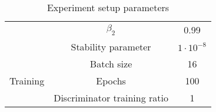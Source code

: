 \begin{table}[H]
{\begin{tabular}{|ccc|cc|}
    \multicolumn{1}{|c|}{}                                    & \multicolumn{2}{c|}{}                                                       & $\beta_2$                    & 0.99               \\
    \multicolumn{1}{|c|}{}                                    & \multicolumn{2}{c|}{}                                                       & Stability parameter          & $ 1 \cdot 10^{-8}$ \\ \hline
    \multicolumn{3}{|c|}{\multirow{3}{*}{Training}}                                                                                         & Batch size                   & 16                 \\
    \multicolumn{3}{|c|}{}                                                                                                                  & Epochs                       & 100                \\
    \multicolumn{3}{|c|}{}                                                                                                                  & Discriminator training ratio & 1                  \\ \hline
    \end{tabular}%
    }
    \caption{Experiment setup parameters}
    \label{tab:experiment-setup}
    \end{table}

\newpage
